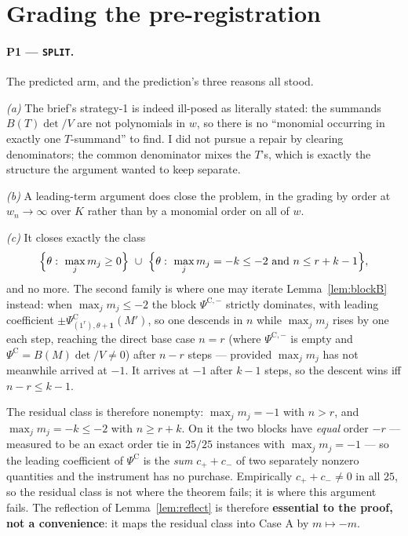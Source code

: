 \documentclass[11pt]{article}
\theoremstyle{definition}
\newcommand{\PsiC}{\Psi^{\mathrm{C}}}
\newcommand{\PsiCs}[1]{\Psi^{\mathrm{C},#1}}
\newcommand{\bone}{\mathbf{1}}
\begin{document}
\section{Grading the pre-registration}\label{sec:grades}

\paragraph{P1 --- \texttt{SPLIT}.} The predicted arm, and the prediction's three reasons all
stood.

\emph{(a)} The brief's strategy-1 is indeed ill-posed as literally stated: the summands
$B(T)\det/V$ are not polynomials in $w$, so there is no ``monomial occurring in exactly one
$T$-summand'' to find. I did not pursue a repair by clearing denominators; the common
denominator mixes the $T$'s, which is exactly the structure the argument wanted to keep
separate.

\emph{(b)} A leading-term argument does close the problem, in the grading by order at
$w_n\to\infty$ over $K$ rather than by a monomial order on all of $w$.

\emph{(c)} It closes exactly the class
\[
  \Bigl\{\theta:\ \max_j m_j\ge0\Bigr\}
  \ \cup\
  \Bigl\{\theta:\ \max_j m_j=-k\le-2\ \text{and}\ n\le r+k-1\Bigr\},
\]
and no more. The second family is where one may iterate Lemma~\ref{lem:blockB} instead:
when $\max_jm_j\le-2$ the block $\PsiCs{-}$ strictly dominates, with leading coefficient
$\pm\PsiC_{(1^r),\theta+\bone}(M')$, so one descends in $n$ while $\max_jm_j$ rises by one
each step, reaching the direct base case $n=r$ (where $\PsiCs{-}$ is empty and
$\PsiC=B(M)\det/V\ne0$) after $n-r$ steps --- provided $\max_jm_j$ has not meanwhile
arrived at $-1$. It arrives at $-1$ after $k-1$ steps, so the descent wins iff
$n-r\le k-1$.

The residual class is therefore nonempty: $\max_jm_j=-1$ with $n>r$, and
$\max_jm_j=-k\le-2$ with $n\ge r+k$. On it the two blocks have \emph{equal} order
$-r$ --- measured to be an exact order tie in $25/25$ instances with $\max_jm_j=-1$ --- so
the leading coefficient of $\PsiC$ is the \emph{sum} $c_++c_-$ of two separately nonzero
quantities and the instrument has no purchase. Empirically $c_++c_-\ne0$ in all $25$, so
the residual class is not where the theorem fails; it is where this argument fails. The
reflection of Lemma~\ref{lem:reflect} is therefore \textbf{essential to the proof, not a
convenience}: it maps the residual class into Case A by $m\mapsto-m$.
\end{document}
